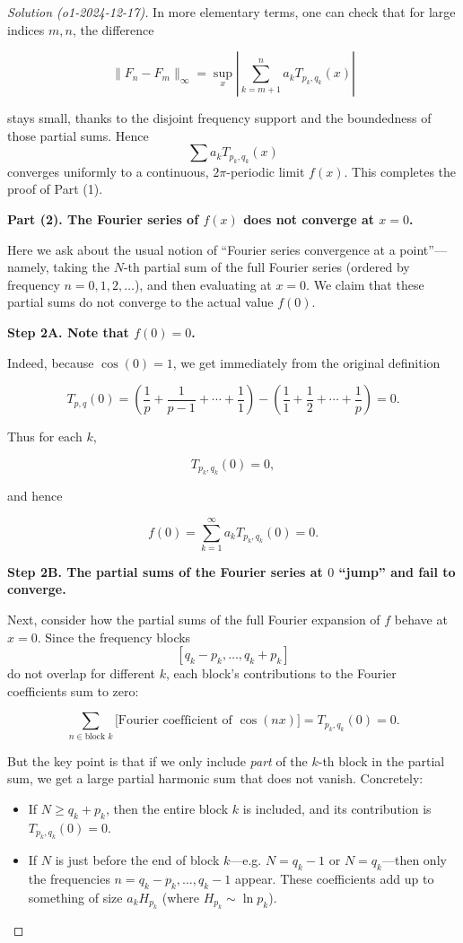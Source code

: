 \documentclass[11pt]{article}
\numberwithin{equation}{section}
\begin{document}
\begin{proof}[Solution (o1-2024-12-17)]
In more elementary terms, one can check that for large indices \(m,n\), the difference

\[
\|F_n - F_m\|_{\infty}
= \sup_x \left| \sum_{k=m+1}^{n} a_k T_{p_k,q_k}(x) \right|
\]

stays small, thanks to the disjoint frequency support and the boundedness of those partial sums. Hence  
\[
\sum a_k T_{p_k,q_k}(x)
\]
converges uniformly to a continuous, \(2\pi\)-periodic limit \(f(x)\).  
This completes the proof of Part (1).

\hrulefill

\textbf{Part (2).  The Fourier series of \(f(x)\) does not converge at \(x=0\).}

Here we ask about the usual notion of ``Fourier series convergence at a point''—namely, taking the \(N\)-th partial sum of the full Fourier series (ordered by frequency \(n=0,1,2,\ldots\)), and then evaluating at \(x=0\). We claim that these partial sums do not converge to the actual value \(f(0)\).

\textbf{Step 2A.  Note that \(f(0)=0\).}

Indeed, because \(\cos(0)=1\), we get immediately from the original definition

\[
T_{p,q}(0)
= \left( \frac1p + \frac1{p-1} + \cdots + \frac11 \right)
-
\left( \frac11 + \frac12 + \cdots + \frac1p \right)
= 0.
\]

Thus for each \(k\),

\[
T_{p_k,q_k}(0)=0,
\]

and hence

\[
f(0)=\sum_{k=1}^{\infty} a_k T_{p_k,q_k}(0)=0.
\]

\textbf{Step 2B.  The partial sums of the Fourier series at \(0\) ``jump'' and fail to converge.}

Next, consider how the partial sums of the full Fourier expansion of \(f\) behave at \(x=0\). Since the frequency blocks
\[
[q_k - p_k,\ldots, q_k + p_k]
\]
do not overlap for different \(k\), each block’s contributions to the Fourier coefficients sum to zero:

\[
\sum_{n\in \text{block }k}
\bigl[\text{Fourier coefficient of }\cos(nx)\bigr]
= T_{p_k,q_k}(0) = 0.
\]

But the key point is that if we only include \emph{part} of the \(k\)-th block in the partial sum, we get a large partial harmonic sum that does not vanish. Concretely:

\begin{itemize}
\item If \(N\ge q_k + p_k\), then the entire block \(k\) is included, and its contribution is \(T_{p_k,q_k}(0)=0\).
\item If \(N\) is just before the end of block \(k\)—e.g. \(N=q_k - 1\) or \(N=q_k\)—then only the frequencies  
\(n=q_k - p_k,\ldots, q_k - 1\)  
appear. These coefficients add up to something of size \(a_k H_{p_k}\) (where \(H_{p_k}\sim \ln p_k\)).
\end{itemize}


\end{proof}
\end{document}
